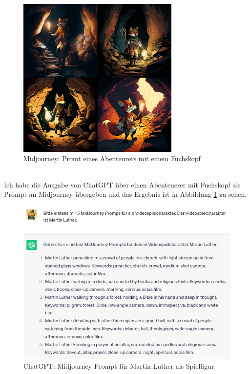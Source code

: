 \\
\begin{figure}
	\centering
	\includegraphics[width=8.022cm]{BilderFuerBA/fuchsKopfAbenteuerer.png}
	\caption{Midjourney: Promt eines Abenteurers mit einem Fuchskopf}
	\label{MidjourneyFuchsKopfAbenteuerer}
\end{figure}
\\
Ich habe die Ausgabe von ChatGPT über einen Abenteuerer mit Fuchskopf als Prompt an Midjourney übergeben und das Ergebnis ist in Abbildung \ref{MidjourneyFuchsKopfAbenteuerer} zu sehen.
\\
\begin{figure}
	\centering
	\includegraphics[scale=0.7]{BilderFuerBA/07.png}
	\caption{ChatGPT: Midjourney Prompt für Martin Luther als Spielfigur}
	\label{chatgptMartinLutherMJformelErstenFünf}
\end{figure}
\\
